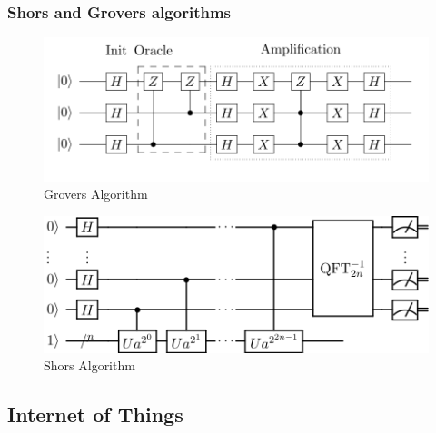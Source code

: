 \documentclass[ucs,10pt]{beamer}
\begin{document}
\begin{frame}
  \frametitle{Shors and Grovers algorithms}
    \begin{figure}[htbp]
      \centering
      \includegraphics[width=.7\textwidth]{../graphics/grover_circuit_3qubits.png}
      \caption{Grovers Algorithm \cite{img:grover}}
      \label{grover}
    \end{figure}
  
    \begin{figure}[htbp]
      \centering
      \includegraphics[width=.5\textwidth]{../graphics/Shor's_algorithm.png}
      \caption{Shors Algorithm\cite{img:shor}}
      \label{shor}
    \end{figure}

\end{frame}

\subsection{Internet of Things}
\end{document}
